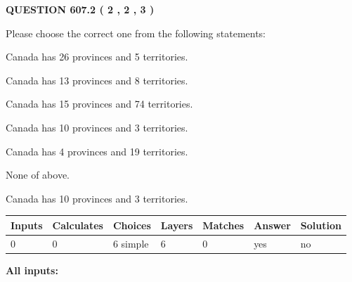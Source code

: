 \documentclass[12pt]{article}
\begin{document}
   
  
\vspace{0.2in}
  
{\textbf{\Large{QUESTION
607.2 
 ( 2 , 2 , 3 )
}}}
  
  
Please choose the correct one from the following statements:
 
 
Canada has  26 provinces and  5 territories.
 
 
Canada has  13 provinces and  8 territories.
 
 
Canada has  15 provinces and  74 territories.
 
 
Canada has 10  provinces and 3 territories.
 
 
Canada has   4 provinces and  19 territories.
 
 
 None of above.
 
 
\noindent{}
 
 
Canada has 10  provinces and 3 territories.
 
 
\noindent{}
 
 
   
   
   
   
\noindent\begin{tabular}{|l|l|l|l|l|l|l|}
 \hline
Inputs & Calculates & Choices & Layers & Matches & Answer & Solution \\ \hline
 0  & 
 0  & 
 6
  simple  
  & 
 6  & 
 0  & 
  yes & 
  no 
  \\ \hline
 \end{tabular}
   
   
   
   
\noindent{}
   
   
   
   
\noindent\vspace{0.1in}\hspace{-0.08in} {\textbf{\Large{All inputs: }}}
   
   
   
   
   
   
 \vspace{0.2in}
 
\end{document}
